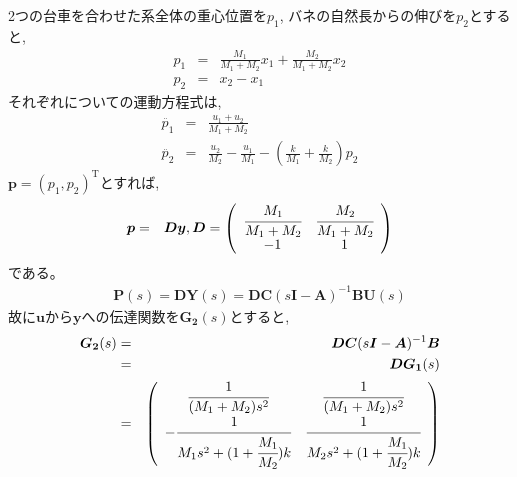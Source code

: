 \documentclass[12pt]{jsarticle}   	%
\begin{document}
\subsection{}
2つの台車を合わせた系全体の重心位置を$p_1$, バネの自然長からの伸びを$p_2$とすると, 
\begin{eqnarray}
p_1 &=& \frac{M_1}{M_1 + M_2}x_1 + \frac{M_2}{M_1 + M_2}x_2 \\
p_2 &=& x_2 -x_1
\end{eqnarray}
それぞれについての運動方程式は, 
\begin{eqnarray}
\ddot{p_1} &=& \frac{u_1 + u_2}{M_1 + M_2} \\
\ddot{p_2} &=& \frac{u_2}{M_2} - \frac{u_1}{M_1} - (\frac{k}{M_1} + \frac{k}{M_2})p_2
\end{eqnarray}
$\bm{p} = (p_1, p_2)^{\mathrm{T}}$とすれば, 
\begin{eqnarray}
\bm{p} &=& \bm{D}\bm{y} , \bm{D} =  \left(
    \begin{array}{cc}
      \cfrac{M_1}{M_1 + M_2} & \cfrac{M_2}{M_1 + M_2} \\
      -1 & 1
    \end{array}
  \right)
\end{eqnarray}
である。
\begin{eqnarray}
\bm{P}(s) = \bm{D}\bm{Y}(s) = \bm{D}\bm{C}(s\bm{I} - \bm{A})^{-1}\bm{B}\bm{U}(s) 
\end{eqnarray}
故に$\bm{u}$から$\bm{y}$への伝達関数を$\bm{G_2}(s)$とすると, 
\begin{eqnarray}
\bm{G_2}(s) &=& \bm{D}\bm{C}(s\bm{I} - \bm{A})^{-1}\bm{B} \\
&=& \bm{D}\bm{G_1}(s) \\
&=&  \left(
    \begin{array}{cc}
      \cfrac{1}{(M_1+M_2)s^2} & \cfrac{1}{(M_1+M_2)s^2} \\
      -\cfrac{1}{M_1 s^2 + (1+\cfrac{M_1}{M_2})k} & \cfrac{1}{M_2 s^2 + (1+\cfrac{M_1}{M_2})k}
    \end{array}
  \right)
\end{eqnarray}
\end{document}
